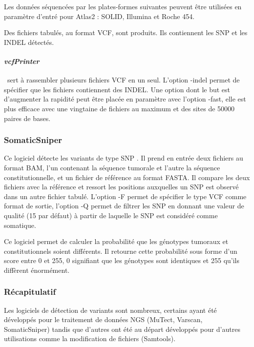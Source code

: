 Les données séquencées par les plates-formes suivantes peuvent être utilisées en paramètre d'entré pour Atlas2 : SOLID, Illumina et Roche 454.

Des fichiers tabulés, au format VCF, sont produits. Ils contiennent les SNP et les INDEL détectés.

\paragraph{\textit{vcfPrinter}} ~sert à rassembler plusieurs fichiers VCF en un seul. L'option -indel permet de spécifier que les fichiers contiennent des INDEL. Une option dont le but est d'augmenter la rapidité peut être placée en paramètre avec l'option -fast, elle est plus efficace avec une vingtaine de fichiers au maximum et des sites de 50000 paires de bases.

\subsubsection{SomaticSniper}\label{Somatic}

Ce logiciel détecte les variants de type SNP \citep{Sniper}. Il prend en entrée deux fichiers au format BAM, l'un contenant la séquence tumorale et l'autre la séquence constitutionnelle, et un fichier de référence au format FASTA. Il compare les deux fichiers avec la référence et ressort les positions auxquelles un SNP est observé dans un autre fichier tabulé. L'option -F permet de spécifier le type VCF comme format de sortie, l'option -Q permet de filtrer les SNP en donnant une valeur de qualité (15 par défaut) à partir de laquelle le SNP est considéré comme somatique.

Ce logiciel permet de calculer la probabilité que les génotypes tumoraux et constitutionnels soient différents. Il retourne cette probabilité sous forme d'un score entre 0 et 255, 0 signifiant que les génotypes sont identiques et 255 qu'ils diffèrent énormément.

\subsubsection{Récapitulatif}

Les logiciels de détection de variants sont nombreux, certains ayant été développés pour le traitement de données NGS (MuTect, Varscan, SomaticSniper) tandis que d'autres ont été au départ développés pour d'autres utilisations comme la modification de fichiers (Samtools). 

